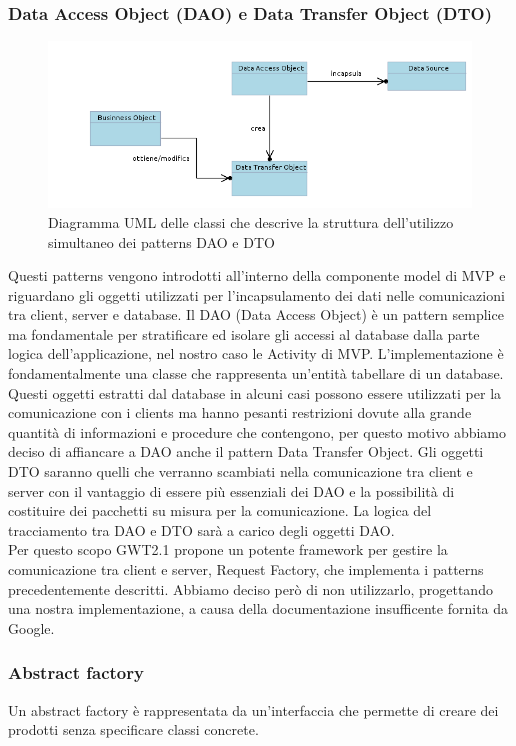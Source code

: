 \subsubsection{Data Access Object (DAO)  e  Data Transfer Object (DTO)}
\begin{figure}[h]
\centering
\includegraphics[width=15cm]{img/ST/DAO_DTO.png}
\caption{Diagramma UML delle classi che descrive la struttura dell'utilizzo
simultaneo dei patterns DAO e DTO}
\end{figure}
Questi patterns vengono introdotti all'interno della componente model di MVP e
riguardano gli oggetti utilizzati per l'incapsulamento dei dati nelle
comunicazioni tra client, server e database. 
Il DAO (Data Access Object) \`e un pattern semplice ma fondamentale per
stratificare ed isolare gli accessi al database dalla parte logica
dell'applicazione, nel nostro caso le Activity di MVP. L'implementazione \`e
fondamentalmente una classe che rappresenta un'entit\`a tabellare di un database.
Questi oggetti estratti dal database in alcuni casi possono essere utilizzati
per la comunicazione con i clients ma hanno pesanti restrizioni dovute alla
grande quantit\`a di informazioni e procedure che contengono, per questo motivo
abbiamo deciso di affiancare a DAO anche il pattern Data Transfer Object. Gli
oggetti DTO saranno quelli che verranno scambiati nella comunicazione tra client
e server con il vantaggio di essere pi\`u essenziali dei DAO e la possibilit\`a di
costituire dei pacchetti su misura per la comunicazione. La logica del
tracciamento tra DAO e DTO sar\`a a carico degli oggetti DAO.
\\
Per questo scopo GWT2.1 propone un potente framework per gestire la
comunicazione tra client e server, Request Factory, che implementa i patterns
precedentemente descritti. Abbiamo deciso per\`o di non utilizzarlo, progettando
una nostra implementazione, a causa della documentazione insufficente fornita
da Google.

\newpage
\subsubsection{Abstract factory}
Un abstract factory \`e rappresentata da un'interfaccia che permette di creare dei
prodotti senza specificare classi concrete.

